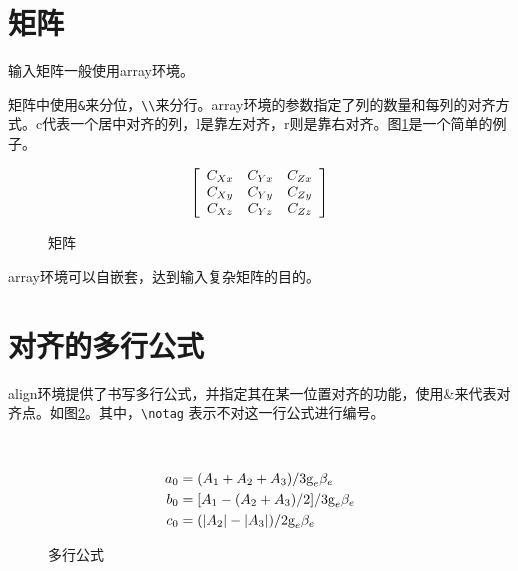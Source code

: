 \section{矩阵}
输入矩阵一般使用array环境。

矩阵中使用\verb|&|来分位，\verb|\\|来分行。array环境的参数指定了列的数量和每列的对齐方式。c代表一个居中对齐的列，l是靠左对齐，r则是靠右对齐。图\ref{f:matrix}是一个简单的例子。
\begin{figure}[h]
\centering
{}
\hspace{0.1\textwidth}
\begin{minipage}[h]{0.4\textwidth}
\centering
\begin{code}
\[\left[\begin{array}{c c c}
C_{Xx} & C_{Yx} & C_{Zx}\\
C_{Xy} & C_{Yy} & C_{Zy}\\
C_{Xz} & C_{Yz} & C_{Zz}
\end{array}\right]\]
\end{code}
\end{minipage}
\caption{矩阵}
\label{f:matrix}
\end{figure}

array环境可以自嵌套，达到输入复杂矩阵的目的。

\section{对齐的多行公式}
align环境提供了书写多行公式，并指定其在某一位置对齐的功能，使用\&来代表对齐点。如图\ref{f:align}。其中，\verb|\notag| 表示不对这一行公式进行编号。
\begin{figure}[h]
\centering
{}\\
\begin{minipage}[b]{0.8\textwidth}
\centering
\begin{code}
\begin{align}
a_0&=(A_1+A_2+A_3)/3\textrm{g}_e\beta_e\\
b_0&=[A_1-(A_2+A_3)/2]/3\textrm{g}_e\beta_e\notag\\
c_0&=(|A_2|-|A_3|)/2\textrm{g}_e\beta_e
\end{align}
\end{code}
\end{minipage}
\caption{多行公式}
\label{f:align}
\end{figure}

